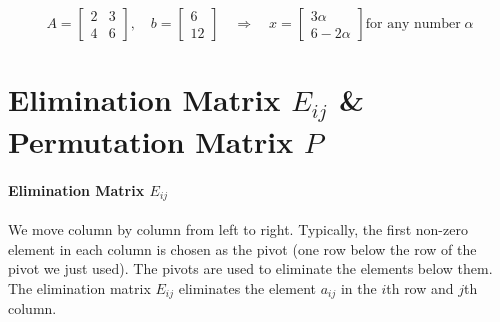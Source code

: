 \[
    A=
    \begin{bmatrix}
        2 & 3 \\
        4 & 6
    \end{bmatrix},
    \quad
    b=
    \begin{bmatrix}
        6 \\ 12
    \end{bmatrix}
    \quad\Rightarrow\quad
    x=
    \begin{bmatrix}
        3\alpha \\ 6-2\alpha
    \end{bmatrix}
    \text{for any number} \; \alpha
\]

\section{Elimination Matrix $E_{ij}$ \& Permutation Matrix $P$}

\paragraph{Elimination Matrix $E_{ij}$}
We move column by column from left to right. Typically, the first non-zero element in each column is chosen as the pivot (one row below the row of the pivot we just used).
The pivots are used to eliminate the elements below them.
The elimination matrix $E_{ij}$ eliminates the element $a_{ij}$ in the $i$th row and $j$th column.

